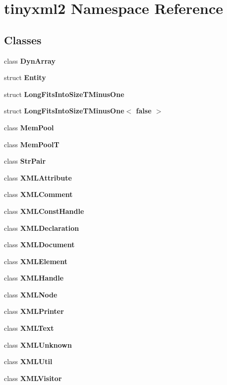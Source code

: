 \section{tinyxml2 Namespace Reference}
\label{namespacetinyxml2}
\subsection*{Classes}
\begin{DoxyCompactItemize}
\item 
class \textbf{ Dyn\+Array}
\item 
struct \textbf{ Entity}
\item 
struct \textbf{ Long\+Fits\+Into\+Size\+T\+Minus\+One}
\item 
struct \textbf{ Long\+Fits\+Into\+Size\+T\+Minus\+One$<$ false $>$}
\item 
class \textbf{ Mem\+Pool}
\item 
class \textbf{ Mem\+PoolT}
\item 
class \textbf{ Str\+Pair}
\item 
class \textbf{ X\+M\+L\+Attribute}
\item 
class \textbf{ X\+M\+L\+Comment}
\item 
class \textbf{ X\+M\+L\+Const\+Handle}
\item 
class \textbf{ X\+M\+L\+Declaration}
\item 
class \textbf{ X\+M\+L\+Document}
\item 
class \textbf{ X\+M\+L\+Element}
\item 
class \textbf{ X\+M\+L\+Handle}
\item 
class \textbf{ X\+M\+L\+Node}
\item 
class \textbf{ X\+M\+L\+Printer}
\item 
class \textbf{ X\+M\+L\+Text}
\item 
class \textbf{ X\+M\+L\+Unknown}
\item 
class \textbf{ X\+M\+L\+Util}
\item 
class \textbf{ X\+M\+L\+Visitor}
\end{DoxyCompactItemize}
